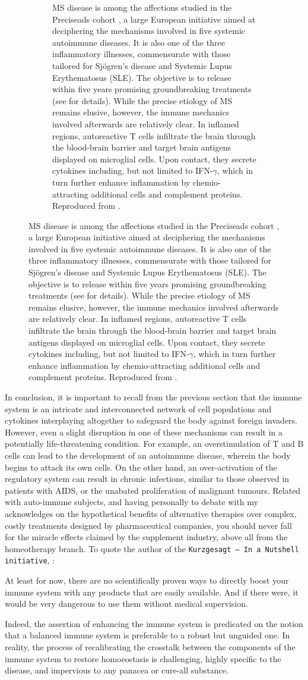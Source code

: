 \begin{figure}
\begin{subfigure}[p]{0.8\textwidth}
         \label{subfig:cross-reactivity}
         \caption[\textbf{The pathogenesis of multiple sclerosis (MS).}]{MS disease is among the affections studied in the Preciseads cohort \autocite{soret_etal21} \autocite{barturen_etal21}, a large European initiative aimed at deciphering the mechanisms involved in five systemic autoimmune diseases. It is also one of the three inflammatory illnesses, commensurate with those tailored for Sjögren's disease and Systemic Lupus Erythematosus (SLE). The objective is to release within five years promising groundbreaking treatments (see  for details). While the precise etiology of MS remains elusive, however, the immune mechanics involved afterwards are relatively clear. In inflamed regions, autoreactive T cells  infiltrate the brain through the blood-brain barrier and target brain antigens displayed on microglial cells. Upon contact, they secrete cytokines including, but not limited to IFN-$\gamma$, which in turn further enhance inflammation by chemio-attracting additional cells and complement proteins. Reproduced from \autocite[Fig. 15.25, Chap. 25]{murphy_etal22}.}
     \end{subfigure}
\end{figure}


In conclusion, it is important to recall from the previous section that the immune system is an intricate and interconnected network of cell populations and cytokines interplaying altogether to safeguard the body against foreign invaders. However, even a slight disruption in one of these mechanisms can result in a potentially life-threatening condition. For example, an overstimulation of T and B cells can lead to the development of an autoimmune disease, wherein the body begins to attack its own cells. On the other hand, an over-activation of the regulatory system can result in chronic infections, similar to those observed in patients with AIDS, or the unabated proliferation of malignant tumours.
	Related with auto-immune subjects, and having personally to debate with my acknowledges on the hypothetical benefits of alternative therapies over complex, costly treatments designed by pharmaceutical companies, you should never fall for the miracle effects claimed by the supplement industry, above all from the homeotherapy branch. To quote the author of the \texttt{Kurzgesagt – In a Nutshell initiative}, \autocite{dettmer21}: 
	\begin{displayquote}
	At least for now, there are no scientifically proven ways to directly boost your immune system with any products that are easily available. And if there were, it would be very dangerous to use them without medical supervision.
	\end{displayquote}
	 Indeed, the assertion of enhancing the immune system is predicated on the notion that a balanced immune system is preferable to a robust but unguided one. In reality, the process of recalibrating the crosstalk between the components of the immune system to restore homoeostasis is challenging, highly specific to the disease, and impervious to any panacea or cure-all substance.
	



